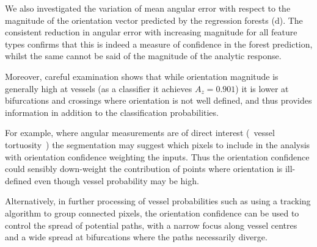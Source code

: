 We also investigated the variation of mean angular error with respect to the magnitude of the orientation vector predicted by the regression forests (d). The consistent reduction in angular error with increasing magnitude for all feature types confirms that this is indeed a measure of confidence in the forest prediction, whilst the same cannot be said of the magnitude of the analytic response.

Moreover, careful examination shows that while orientation magnitude is generally high at vessels (as a classifier it achieves $A_z = 0.901$) it is lower at bifurcations and crossings where orientation is not well defined, and thus provides information in addition to the classification probabilities. 

For example, where angular measurements are of direct interest (\eg~vessel tortuosity~\cite{Hart_etal_IJMI99}) the segmentation may suggest which pixels to include in the analysis with orientation confidence weighting the inputs. Thus the orientation confidence could sensibly down-weight the contribution of points where orientation is ill-defined even though vessel probability may be high.

Alternatively, in further processing of vessel probabilities such as using a tracking algorithm to group connected pixels, the orientation confidence can be used to control the spread of potential paths, with a narrow focus along vessel centres and a wide spread at bifurcations where the paths necessarily diverge.
